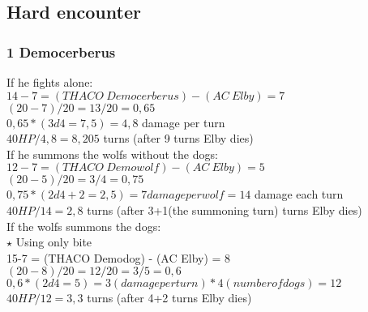\subsection{Hard encounter}

\subsubsection*{1 Democerberus}
If he fights alone:\\
$14-7 = (THACO\:Democerberus) - (AC\:Elby) = 7$\\
$(20-7)/20 = 13/20 = 0,65$\\
$0,65 * (3d4 = 7,5) = 4,8$ damage per turn\\
$40 HP/ 4,8 = 8,205$ turns (after 9 turns Elby dies)\\
\newline
If he summons the wolfs without the dogs:\\
$12-7 = (THACO\:Demowolf) - (AC\:Elby) = 5$\\
$(20-5)/20 = 3/4 = 0,75$\\
$0,75 * (2d4+2 = 2,5) = 7 damage per wolf = 14$ damage each turn\\
$40 HP/ 14 = 2,8$ turns (after 3+1(the summoning turn) turns Elby dies) \\
\newline
If the wolfs summons the dogs:\\
$\star$ Using only bite\\
15-7 = (THACO Demodog) - (AC Elby) = 8\\
$(20-8)/20 = 12/20 = 3/5 =  0,6$\\
$0,6 * (2d4 = 5) = 3 (damage per turn) * 4 (number of dogs) = 12$\\
$40 HP / 12 = 3,3$ turns (after 4+2 turns Elby dies)


